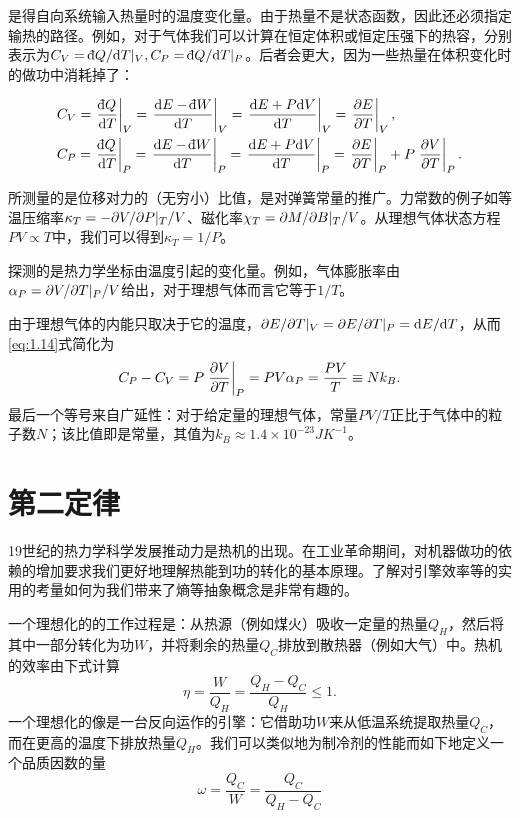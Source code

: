 	是得自向系统输入热量时的温度变化量。由于热量不是状态函数，因此还必须指定输热的路径。例如，对于气体我们可以计算在恒定体积或恒定压强下的热容，分别表示为\(C_V=\ddbar Q/\dd T|_V, C_P=\ddbar Q/\dd T|_P\)。后者会更大，因为一些热量在体积变化时的做功中消耗掉了：

	\begin{equation}\label{eq:1.14}
		\begin{aligned}
			&C_V=\left.\frac{\ddbar Q}{\dd T}\right|_V=\left.\frac{\dd E-\ddbar W}{\dd T}\right|_V=\left.\frac{\dd E+P\dd V}{\dd T}\right|_V=\left.\frac{\pd E}{\pd T}\right|_V,\\
			&C_P=\left.\frac{\ddbar Q}{\dd T}\right|_P=\left.\frac{\dd E-\ddbar W}{\dd T}\right|_P=\left.\frac{\dd E+P\dd V}{\dd T}\right|_P=\left.\frac{\pd E}{\pd T}\right|_P+P\left.\frac{\pd V}{\pd T}\right|_P.
		\end{aligned}
	\end{equation}
	
	所测量的是位移对力的（无穷小）比值，是对弹簧常量的推广。力常数的例子如等温压缩率\(\kappa_T=-\partial V/\partial P|_T/V\)、磁化率\(\chi_T=\partial M/\partial B|_T/V\)。从理想气体状态方程\(PV\propto T\)中，我们可以得到\(\kappa_T=1/P\)。

	探测的是热力学坐标由温度引起的变化量。例如，气体膨胀率由\(\alpha_P=\partial V/\partial T|_P/V\)给出，对于理想气体而言它等于\(1/T\)。

	由于理想气体的内能只取决于它的温度，\(\partial E/\partial T|_{V}=\partial E/\partial T|_{P}={\mathrm d} E/{\mathrm d} T\)，从而\ref{eq:1.14}式简化为
	\begin{equation}
		C_P-C_V=P\left.\frac{\partial V}{\partial T}\right|_{P}=PV\alpha_P=\frac{PV}{T}\equiv Nk_B.
	\end{equation}
	最后一个等号来自广延性：对于给定量的理想气体，常量\(PV/T\)正比于气体中的粒子数$N$；该比值即是常量，其值为\(k_B\approx1.4\times10^{−23}JK^{−1}\)。

\section{第二定律}

	19世纪的热力学科学发展推动力是热机的出现。在工业革命期间，对机器做功的依赖的增加要求我们更好地理解热能到功的转化的基本原理。了解对引擎效率等的实用的考量如何为我们带来了熵等抽象概念是非常有趣的。

	一个理想化的的工作过程是：从热源（例如煤火）吸收一定量的热量\(Q_H\)，然后将其中一部分转化为功$W$，并将剩余的热量\(Q_C\)排放到散热器（例如大气）中。热机的效率由下式计算
	\begin{equation}
		\eta=\frac{W}{Q_H}=\frac{Q_H-Q_C}{Q_H}\leq1.
	\end{equation}
	一个理想化的像是一台反向运作的引擎：它借助功$W$来从低温系统提取热量$Q_C$，而在更高的温度下排放热量$Q_H$。我们可以类似地为制冷剂的性能而如下地定义一个品质因数的量
	\begin{equation}
		\omega=\frac{Q_C}{W}=\frac{Q_C}{Q_H-Q_C}
	\end{equation}

